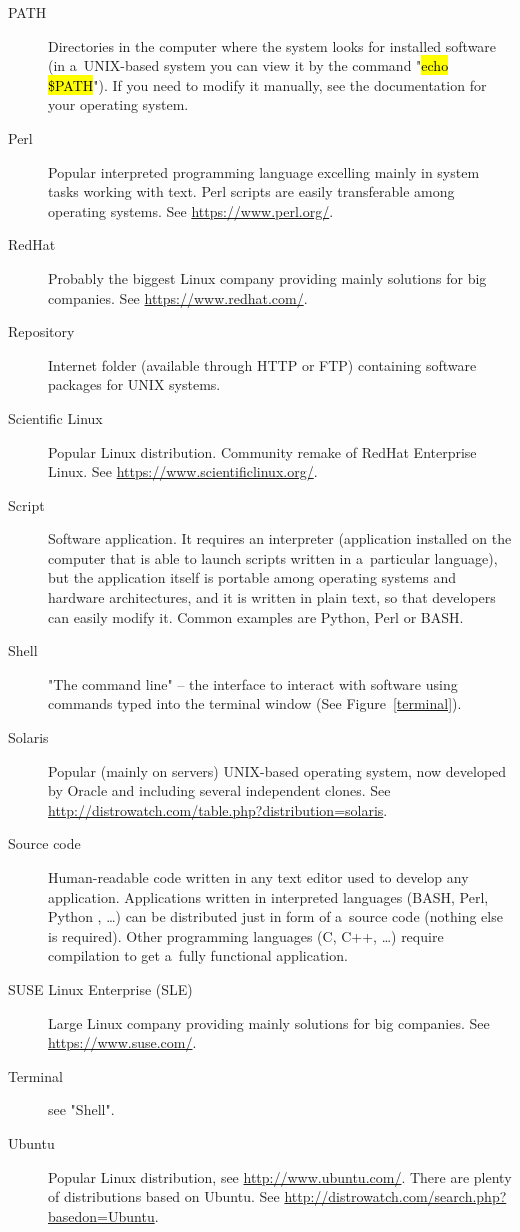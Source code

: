 \documentclass[a4paper, 11pt, twoside]{article}
\renewcommand{\texttt}[1]{\hl{\ttfamily #1}}
\begin{document}
\begin{description}
  \item[PATH] Directories in the computer where the system looks for installed software (in a~UNIX-based system you can view it by the command "\texttt{echo \$PATH}"). If you need to modify it manually, see the documentation for your operating system.
  \item[Perl] Popular interpreted programming language excelling mainly in system tasks working with text. Perl scripts are easily transferable among operating systems. See \url{https://www.perl.org/}.
  \item[RedHat] Probably the biggest Linux company providing mainly solutions for big companies. See \url{https://www.redhat.com/}.
  \item[Repository] Internet folder (available through HTTP or FTP) containing software packages for UNIX systems.
  \item[Scientific Linux] Popular Linux distribution. Community remake of RedHat Enterprise Linux. See \url{https://www.scientificlinux.org/}.
  \item[Script] Software application. It requires an interpreter (application installed on the computer that is able to launch scripts written in a~particular language), but the application itself is portable among operating systems and hardware architectures, and it is written in plain text, so that developers can easily modify it. Common examples are Python, Perl or BASH.
  \item[Shell] "The command line" -- the interface to interact with software using commands typed into the terminal window (See Figure~\ref{terminal}).
  \item[Solaris] Popular (mainly on servers) UNIX-based operating system, now developed by Oracle and including several independent clones. See \url{http://distrowatch.com/table.php?distribution=solaris}.
  \item[Source code] Human-readable code written in any text editor used to develop any application. Applications written in interpreted languages (BASH, Perl, Python , \ldots) can be distributed just in form of a~source code (nothing else is required). Other programming languages (C, C++, \ldots) require compilation to get a~fully functional application.
  \item[SUSE Linux Enterprise (SLE)] Large Linux company providing mainly solutions for big companies. See \url{https://www.suse.com/}.
  \item[Terminal] see "Shell".
  \item[Ubuntu] Popular Linux distribution, see \url{http://www.ubuntu.com/}. There are plenty of distributions based on Ubuntu. See \url{http://distrowatch.com/search.php?basedon=Ubuntu}.

\end{description}
\end{document}
